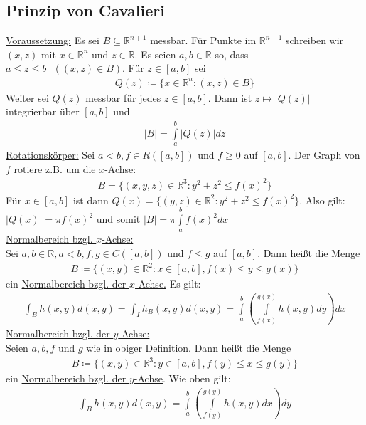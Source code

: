 \documentclass{article}
\begin{document}
\subsection{Prinzip von Cavalieri}
\label{sec: Cavalieri}
\underline{Voraussetzung:} Es sei $B \subseteq \mathbb{R}^{n+1}$ messbar. Für Punkte im $\mathbb{R}^{n+1}$ schreiben wir $(x,z)$ mit $x \in \mathbb{R}^n$ und $z \in \mathbb{R}$. 
Es seien $a,b \in \mathbb{R}$ so, dass $a \leq z \leq b \text{ } ((x,z) \in B)$. Für $z \in [a,b]$ sei 
\begin{align*}
    Q(z) \coloneqq \{ x \in \mathbb{R}^n: (x,z) \in B\}
\end{align*}
Weiter sei $Q(z)$ messbar für jedes $z \in [a,b]$. Dann ist $z \mapsto \lvert Q(z)\rvert$ integrierbar über $[a,b]$ und 
\begin{align*}
    \lvert B\rvert = \int \limits_a^b \lvert Q(z)\rvert dz
\end{align*}
\underline{Rotationskörper:} Sei $a < b, f \in R([a,b])$ und $f \geq 0$ auf $[a,b]$. Der Graph von $f$ rotiere z.B. um die $x$-Achse:
\begin{align*}
    B = \{ (x,y,z) \in \mathbb{R}^3: y^2+z^2 \leq f(x)^2\}
\end{align*}
Für $x \in [a,b]$ ist dann $Q(x) = \{ (y,z) \in \mathbb{R}^2: y^2+z^2\leq f(x)^2\}$. Also gilt: $\lvert Q(x) \rvert = \pi f(x)^2$ und somit $\lvert B \rvert = \pi \int \limits_a^b f(x)^2 dx$ \\
\underline{Normalbereich bzgl. $x$-Achse:} \\
Sei $a,b \in \mathbb{R}, a < b, f,g \in C([a,b])$ und $f \leq g$ auf $[a,b]$. Dann heißt die Menge
\begin{align*}
    B \coloneqq \{ (x,y) \in \mathbb{R}^2: x \in [a,b], f(x) \leq y \leq g(x)\}
\end{align*}
ein \underline{Normalbereich bzgl. der $x$-Achse.} Es gilt:
\begin{align*}
    \int_B h(x,y) d(x,y) = \int_I h_B(x,y) d(x,y) = \int \limits_a^b (\int \limits_{f(x)}^{g(x)} h(x,y) dy)dx
\end{align*}
\underline{Normalbereich bzgl. der $y$-Achse:} \\
Seien $a,b,f$ und $g$ wie in obiger Definition. Dann heißt die Menge 
\begin{align*}
    B \coloneqq \{ (x,y) \in \mathbb{R}^3: y \in [a,b], f(y) \leq x \leq g(y)\}
\end{align*}
ein \underline{Normalbereich bzgl. der $y$-Achse}. Wie oben gilt:
\begin{align*}
    \int_B h(x,y) d(x,y) = \int \limits_a^b (\int \limits_{f(y)}^{g(y)} h(x,y) dx)dy
\end{align*}
\end{document}
